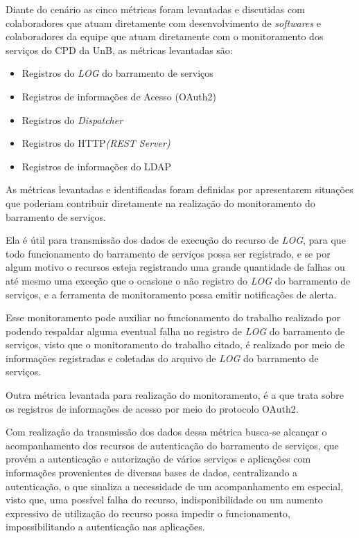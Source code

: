 Diante do cenário as cinco métricas foram levantadas e discutidas com colaboradores que atuam diretamente com desenvolvimento de  \textit{softwares} e colaboradores da equipe que atuam diretamente com o monitoramento dos serviços do \acrshort{CPD} da \acrshort{UnB}, as métricas levantadas são: 

\begin{itemize}
    \item Registros do \textit{LOG} do barramento de serviços
    \item Registros de informações de Acesso (OAuth2)
    \item Registros do \textit{Dispatcher}
    \item Registros do HTTP\textit{(REST Server)}
    \item Registros de informações do LDAP
\end{itemize}

As métricas levantadas e identificadas foram definidas por apresentarem situações que poderiam contribuir diretamente na realização do monitoramento do barramento de serviços. 

Ela é útil para transmissão dos dados de execução do recurso de \textit{LOG}, para que todo funcionamento do barramento de serviços possa ser registrado, e se por algum motivo o recursos esteja registrando uma grande quantidade de falhas ou até mesmo uma exceção que o ocasione o não registro do \textit{LOG} do barramento de serviços, e a ferramenta de monitoramento possa emitir notificações de alerta.

Esse monitoramento pode auxiliar no funcionamento do trabalho realizado por \cite{filgueirasmonitoramento} podendo respaldar alguma eventual falha no registro de \textit{LOG} do barramento de serviços, visto que o monitoramento do trabalho citado, é realizado por meio de informações registradas e coletadas do arquivo de \textit{LOG} do barramento de serviços. 

Outra métrica levantada para realização do monitoramento, é a que trata sobre os registros de informações de acesso por meio do protocolo OAuth2. 

Com realização da transmissão dos dados dessa métrica busca-se alcançar o acompanhamento dos recursos de autenticação do barramento de serviços, que provém a autenticação e autorização de vários serviços e aplicações com informações provenientes de diversas bases de dados, centralizando a autenticação, o que sinaliza a necessidade de um acompanhamento em especial, visto que, uma possível falha do recurso, indisponibilidade ou um aumento expressivo de utilização do recurso possa impedir o funcionamento, impossibilitando a autenticação nas aplicações. 

